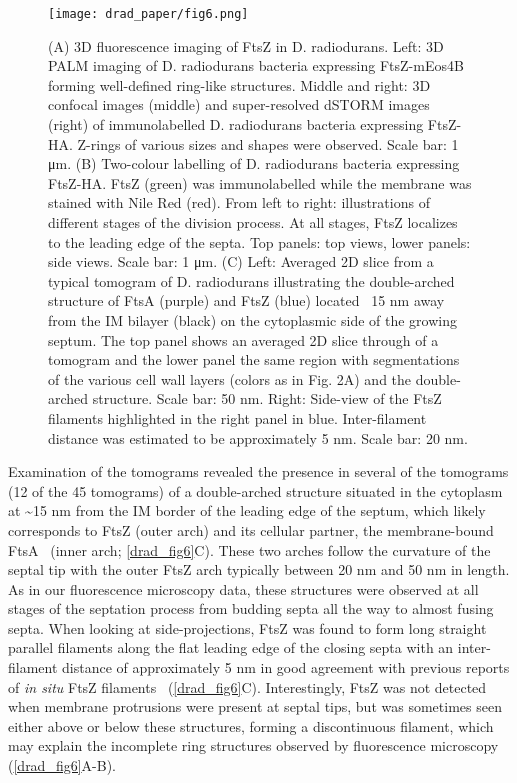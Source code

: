 \begin{figure}[ht]
    \centering
    \texttt{[image: drad\_paper/fig6.png]}
    \label{drad_fig6}
\end{figure}
\begin{figure}[ht]
    \ContinuedFloat
    \caption[]{(A) 3D fluorescence imaging of FtsZ in D. radiodurans. Left: 3D PALM imaging of D. radiodurans bacteria expressing FtsZ-mEos4B forming well-defined ring-like structures. Middle and right: 3D confocal images (middle) and super-resolved dSTORM images (right) of immunolabelled D. radiodurans bacteria expressing FtsZ-HA. Z-rings of various sizes and shapes were observed. Scale bar: 1 μm. (B) Two-colour labelling of D. radiodurans bacteria expressing FtsZ-HA. FtsZ (green) was immunolabelled while the membrane was stained with Nile Red (red). From left to right: illustrations of different stages of the division process. At all stages, FtsZ localizes to the leading edge of the septa. Top panels: top views, lower panels: side views. Scale bar: 1 μm. (C) Left: Averaged 2D slice from a typical tomogram of D. radiodurans illustrating the double-arched structure of FtsA (purple) and FtsZ (blue) located ~15 nm away from the IM bilayer (black) on the cytoplasmic side of the growing septum. The top panel shows an averaged 2D slice through of a tomogram and the lower panel the same region with segmentations of the various cell wall layers (colors as in Fig. 2A) and the double-arched structure. Scale bar: 50 nm. Right: Side-view of the FtsZ filaments highlighted in the right panel in blue. Inter-filament distance was estimated to be approximately 5 nm. Scale bar: 20 nm.}
\end{figure}

Examination of the tomograms revealed the presence in several of the tomograms (12 of the 45 tomograms) of a double-arched structure situated in the cytoplasm at \sim15 nm from the IM border of the leading edge of the septum, which likely corresponds to FtsZ (outer arch) and its cellular partner, the membrane-bound FtsA~\cite{sextonSuperresolutionConfocalCryoCLEM2022} (inner arch; \autoref{drad_fig6}C).
These two arches follow the curvature of the septal tip with the outer FtsZ arch typically between 20 nm and 50 nm in length.
As in our fluorescence microscopy data, these structures were observed at all stages of the septation process from budding septa all the way to almost fusing septa.
When looking at side-projections, FtsZ was found to form long straight parallel filaments along the flat leading edge of the closing septa with an inter-filament distance of approximately 5 nm in good agreement with previous reports of \textit{in situ} FtsZ filaments~\cite{liStructureFtsZFilaments2007,szwedziakArchitectureRingFormed2014} (\autoref{drad_fig6}C).
Interestingly, FtsZ was not detected when membrane protrusions were present at septal tips, but was sometimes seen either above or below these structures, forming a discontinuous filament, which may explain the incomplete ring structures observed by fluorescence microscopy (\autoref{drad_fig6}A-B).

